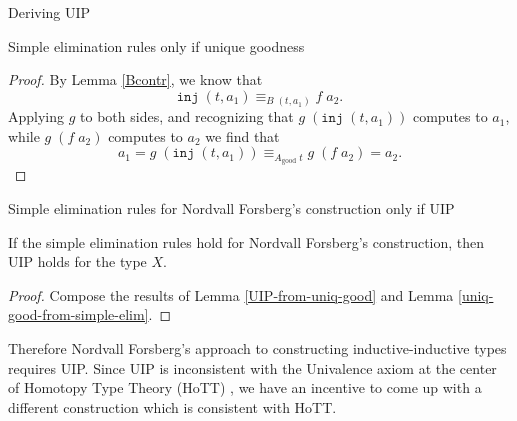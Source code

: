\documentclass[acmsmall,review]{acmart}\settopmatter{printfolios=true,printccs=false,printacmref=false}
\newcommand{\good}[1]{{#1}_\text{good}}
\newcommand{\IdA}[3]{{#1}\equiv_{#3}{#2}}
\newcommand{\inj}{\texttt{inj}}
\def\Forsberg/{Nordvall Forsberg}
\begin{document}
\begin{section}{Deriving UIP}
\begin{subsection}{Simple elimination rules only if unique goodness}
\begin{proof}
    By Lemma \ref{Bcontr}, we know that \[\IdA{\inj\;(t, a_1)}{f\;a_2}{B\;(t, a_1)}.\] Applying $g$ to both sides, and recognizing that $g\;(\inj\;(t,a_1))$ computes to $a_1$, while $g\;(f\;a_2)$ computes to $a_2$ we find that \[a_1 = g\;(\inj\;(t,a_1)) \equiv_{\good{A}\;t} g\;(f\;a_2) = a_2.\]
\end{proof}

\end{subsection}

\begin{subsection}{Simple elimination rules for \Forsberg/'s construction only if UIP}

\begin{theorem}\label{Forsberg-gives-UIP}
    If the simple elimination rules hold for \Forsberg/'s construction, then UIP holds for the type $X$.
\end{theorem}
\begin{proof}
    Compose the results of Lemma \ref{UIP-from-uniq-good} and Lemma \ref{uniq-good-from-simple-elim}.
\end{proof}

Therefore \Forsberg/'s approach to constructing inductive-inductive types requires UIP. Since UIP is inconsistent with the Univalence axiom at the center of Homotopy Type Theory (HoTT) \citep{hottbook}, we have an incentive to come up with a different construction which is consistent with HoTT.

\end{subsection}

\end{section}
\end{document}
